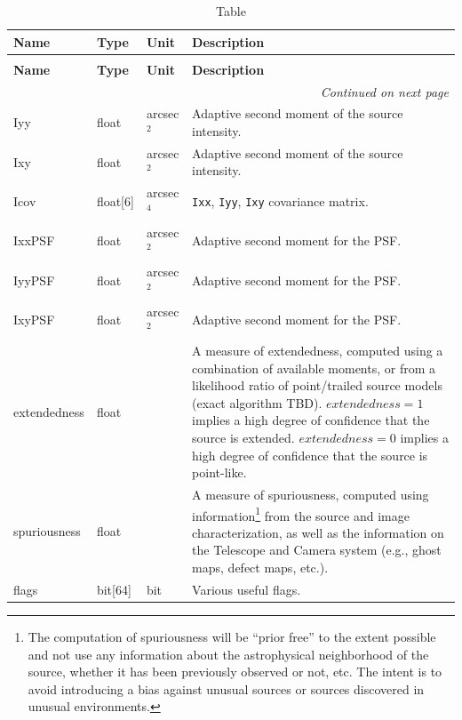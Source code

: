 \documentclass[SE,lsstdraft,toc]{lsstdoc}
\newenvironment{schema}[3]{%
\setlength\LTleft{0pt}
\setlength\LTright{\fill}
\begin{longtable}{p{0.2\textwidth}p{0.14\textwidth}p{0.14\textwidth}p{0.41\textwidth}}

\caption[#1]{#2\label{#3}}\\

\hline \textbf{Name} & \textbf{Type} & \textbf{Unit} & \textbf{Description}\\ \hline
\endfirsthead

\caption[#1]{#2}\\

\hline \textbf{Name} & \textbf{Type} & \textbf{Unit} & \textbf{Description}\\ \hline
\endhead

\hline \multicolumn{4}{r}{\emph{Continued on next page}} \\
\endfoot

\hline\hline
\endlastfoot
}{%
\hline
\end{longtable}
}
\begin{document}
\begin{schema}{\DIASource Table}{\DIASource Table}{tbl:diasourceTable}
Iyy & float & arcsec$^{2}$ & Adaptive second moment of the source intensity. \\

Ixy & float & arcsec$^{2}$ & Adaptive second moment of the source intensity. \\

Icov & float[6] & arcsec$^{4}$ & \texttt{Ixx}, \texttt{Iyy}, \texttt{Ixy} covariance matrix. \\

IxxPSF & float & arcsec$^{2}$ & Adaptive second moment for the PSF. \\

IyyPSF & float & arcsec$^{2}$ & Adaptive second moment for the PSF. \\

IxyPSF & float & arcsec$^{2}$ & Adaptive second moment for the PSF. \\

extendedness & float & ~ & A measure of extendedness, computed using a combination of available moments, or from a likelihood ratio of point/trailed source models (exact algorithm TBD). $extendedness=1$ implies a high degree of confidence that the source is extended. $extendedness=0$ implies a high degree of confidence that the source is point-like. \\

spuriousness & float & ~ & A measure of spuriousness, computed using information\footnote{The computation
of spuriousness will be “prior free” to the extent possible and not use any information about the astrophysical neighborhood of the source, whether it has been previously observed or not, etc. The intent is to avoid introducing
a bias against unusual sources or sources discovered in unusual environments.}
from the source and image characterization, as well as the information on the Telescope and Camera system
(e.g., ghost maps, defect maps, etc.).
\\

flags & bit[64] & bit & Various useful flags.  \\
\end{schema}
\end{document}
